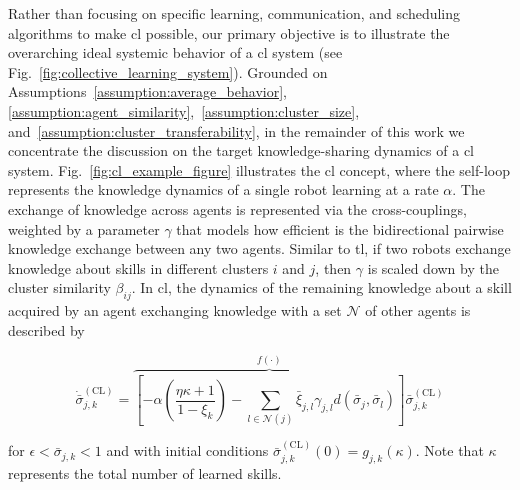 \documentclass[12pt]{article}
\begin{document}
Rather than focusing on specific learning, communication, and scheduling algorithms to make \ac{cl} possible, our primary objective is to illustrate the overarching ideal systemic behavior of a \acl{cl} system (see Fig.~\ref{fig:collective_learning_system}). Grounded on Assumptions~\ref{assumption:average_behavior}, \ref{assumption:agent_similarity},~\ref{assumption:cluster_size}, and~\ref{assumption:cluster_transferability}, in the remainder of this work we concentrate the discussion on the target knowledge-sharing dynamics of a \ac{cl} system. Fig.~\ref{fig:cl_example_figure} illustrates the \ac{cl} concept, where the self-loop represents the knowledge dynamics of a single robot learning at a rate $\alpha$. The exchange of knowledge across agents 
is represented via the cross-couplings, weighted by a parameter $\gamma$ that models how efficient is the bidirectional pairwise knowledge exchange between any two agents. Similar to \ac{tl}, if two robots exchange knowledge about skills in different clusters $i$ and $j$, then $\gamma$ is scaled down by the cluster similarity $\beta_{ij}$. In \ac{cl}, the dynamics of the remaining knowledge  about a skill acquired by an agent exchanging knowledge with a set $\mathcal{N}$ of other agents is described by


\begin{equation}\label{eq:collective_knowledge_dynamics}
	\dot{\bar{\sigma}}^{(\text{CL})}_{j,k} =
		\overbrace{\left[-\alpha \left( \frac{\eta \kappa + 1}{1 - \xi_k} \right)  - \sum\limits_{l \in \mathcal{N}(j)} \bar{\xi}_{j,l} \gamma_{j,l} d(\bar{\sigma}_j,\bar{\sigma}_l)\right]}^{f(\cdot)} \bar{\sigma}^{(\text{CL})}_{j,k}
\end{equation}


\noindent for $\epsilon < \bar{\sigma}_{j,k} < 1$ and with initial conditions $\bar{\sigma}^{(\text{CL})}_{j,k}(0) = g_{j,k}\left(\kappa\right)$. Note that $\kappa$ represents the total number of learned skills.
\end{document}
